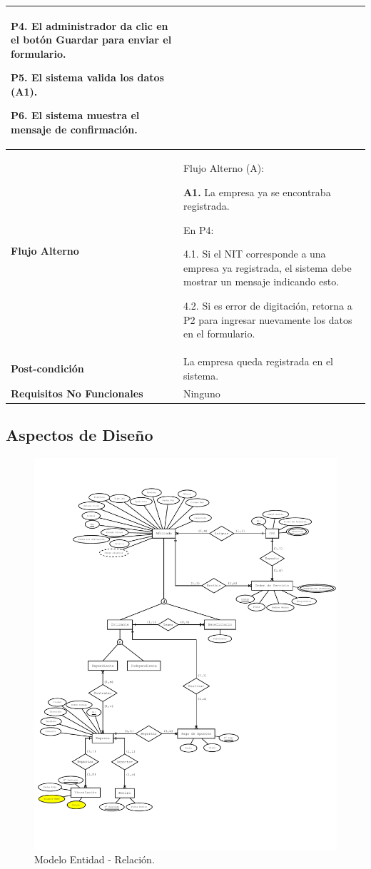 \documentclass[12pt,a4paper]{article}
\begin{document}
\begin{center}
\begin{tabular}{|m{5.5cm}| m{9.5cm}|}
\textbf{P4.} El administrador da clic en el botón Guardar para enviar el formulario.

\textbf{P5.} El sistema valida los datos (A1).

\textbf{P6.} El sistema muestra el mensaje de confirmación.
\\
\hline 
\textbf{Flujo Alterno} &  Flujo Alterno (A):

\textbf{A1.} La empresa ya se encontraba registrada.

	En P4:
	
	4.1. Si el NIT corresponde a una empresa ya registrada, el sistema debe mostrar un mensaje indicando esto.
	
	4.2. Si es error de digitación, retorna a P2 para ingresar nuevamente los datos en el formulario. \\ 
\hline 
\textbf{Post-condición}  & La empresa queda registrada en el sistema. \\ 
\hline 
\textbf{Requisitos No Funcionales} & Ninguno \\ 
\hline 
\end{tabular}
\end{center}
\subsection{Aspectos de Diseño}
\begin{figure}[H]
\centering
{\includegraphics[width=1\textwidth]{Entity_relationship_diagram.pdf} \par}
\caption{Modelo Entidad - Relación.}
\end{figure}
\end{document}
